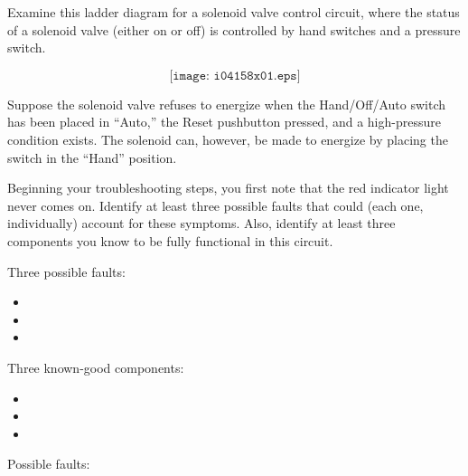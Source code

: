 
Examine this ladder diagram for a solenoid valve control circuit, where the status of a solenoid valve (either on or off) is controlled by hand switches and a pressure switch.

$$\texttt{[image: i04158x01.eps]}$$

Suppose the solenoid valve refuses to energize when the Hand/Off/Auto switch has been placed in ``Auto,'' the Reset pushbutton pressed, and a high-pressure condition exists.  The solenoid can, however, be made to energize by placing the switch in the ``Hand'' position.

Beginning your troubleshooting steps, you first note that the red indicator light never comes on.  Identify at least three possible faults that could (each one, individually) account for these symptoms.  Also, identify at least three components you know to be fully functional in this circuit.

\vskip 10pt

\noindent
Three possible faults:

\begin{itemize}
\item{} 
\vskip 10pt
\item{} 
\vskip 10pt
\item{} 
\end{itemize}

\vskip 10pt

\noindent
Three known-good components:

\begin{itemize}
\item{} 
\vskip 10pt
\item{} 
\vskip 10pt
\item{} 
\end{itemize}














\noindent
Possible faults:

